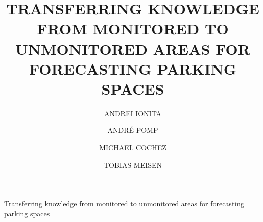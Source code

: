 \documentclass{ws-ijait}
\begin{document}
{Transferring knowledge from monitored to unmonitored areas for forecasting parking spaces}

%
\catchline{}{}{}{}{}
%

\title{TRANSFERRING KNOWLEDGE FROM MONITORED TO UNMONITORED AREAS FOR FORECASTING PARKING SPACES}


\author{ANDREI IONITA}
\address{%
	Computer Science, RWTH Aachen University \\
	Aachen, Germany \\
	andrei.ionita@rwth-aachen.de
}


\author{ANDRÉ POMP}
\address{%
	Institute of Information Management in Mechanical Engineering, RWTH Aachen University,\\
	Aachen Germany \\
	andre.pomp@ima.rwth-aachen.de
}


\author{MICHAEL COCHEZ}
\address{
	Fraunhofer Institute for Applied Information Technology FIT, Aachen, Germany \\
	Computer Science 5, RWTH Aachen University, Germany \\
	Faculty of Information Technology, University of Jyväskylä, Finland \\
	michael.cochez@fit.fraunhofer.de
}

\author{TOBIAS MEISEN}
\address{%
	Chair of Technologies and Management of Digital Transformation, University of Wuppertal, \\
	Wuppertal, Germany \\
	meisen@uni-wuppertal.de
}
\end{document}
